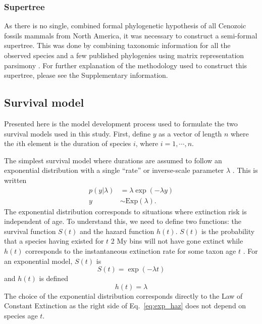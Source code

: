 \subsubsection{Supertree}
As there is no single, combined formal phylogenetic hypothesis of all Cenozoic fossils mammals from North America, it was necessary to construct a semi-formal supertree. This was done by combining taxonomic information for all the observed species and a few published phylogenies using matrix representation parsimony \cite{Bininda-Emonds2007}. For further explanation of the methodology used to construct this supertree, please see the Supplementary information.


\subsection{Survival model}
Presented here is the model development process used to formulate the two survival models used in this study. First, define \(y\) as a vector of length \(n\) where the \(i\)th element is the duration of species \(i\), where \(i = 1,\cdots,n\).

The simplest survival model where durations are assumed to follow an exponential distribution with a single ``rate'' or inverse-scale parameter \(\lambda\) \cite{Klein2003}. This is written
\begin{align}
  p(y | \lambda) &= \lambda \exp(-\lambda y) \nonumber \\
  y &\sim \mathrm{Exp}(\lambda).
  \label{eq:exp}
\end{align}
The exponential distribution corresponds to situations where extinction risk is independent of age. To understand this, we need to define two functions: the survival function \(S(t)\) and the hazard function \(h(t)\). \(S(t)\) is the probability that a species having existed for \(t\) 2 My bins will not have gone extinct while \(h(t)\) corresponds to the instantaneous extinction rate for some taxon age \(t\) \cite{Klein2003}. For an exponential model, \(S(t)\) is 
\begin{equation}
  S(t) = \exp(-\lambda t)
  \label{eq:exp_surv}
\end{equation}
and \(h(t)\) is defined
\begin{equation}
  h(t) = \lambda
  \label{eq:exp_haz}
\end{equation}
The choice of the exponential distribution corresponds directly to the Law of Constant Extinction \cite{VanValen1973} as the right side of Eq.~\ref{eq:exp_haz} does not depend on species age \(t\). 

